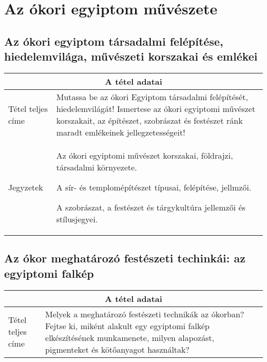 \chapter{Az ókori egyiptom művészete} %
\label{ch:1_okri_egyiptom}

\section{Az ókori egyiptom társadalmi felépítése, hiedelemvilága, művészeti korszakai és emlékei}

\begin{center}
	\begin{longtable}{ | p{} | p{} | }
		
		\hline
		\multicolumn{2}{|c|}{\textbf{A tétel adatai}}
		\\ \hline
		
		\hline
		Tétel teljes címe & Mutassa be az ókori Egyiptom társadalmi felépítését, hiedelemvilágát! Ismertese az ókori egyiptomi művészet korszakait, az építészet, szobrászat és festészet ránk maradt emlékeinek jellegzetességeit!
		\\ \hline
		
		Jegyzetek &
		\begin{compactitem}
			\item Az ókori egyiptomi művészet korszakai, földrajzi, társadalmi környezete.
			\item A sír- és templomépítészet típusai, felépítése, jellmzői.
			\item A szobrászat, a festészet és tárgykultúra jellemzői és stílusjegyei.
		\end{compactitem}
		\\\hline
				
	\end{longtable}
\end{center}

\cleardoublepage

\section{Az ókor meghatározó festészeti techinkái: az egyiptomi falkép}

\begin{center}
	\begin{longtable}{ | p{} | p{} | }
		
		\hline
		\multicolumn{2}{|c|}{\textbf{A tétel adatai}}
		\\ \hline
		
		\hline
		Tétel teljes címe & Melyek a meghatározó festészeti technikák az ókorban? Fejtse ki, miként alakult egy egyiptomi falkép elkészítésének munkamenete, milyen alapozást, pigmenteket és kötőanyagot használtak?
		\\ \hline
		
	\end{longtable}
\end{center}